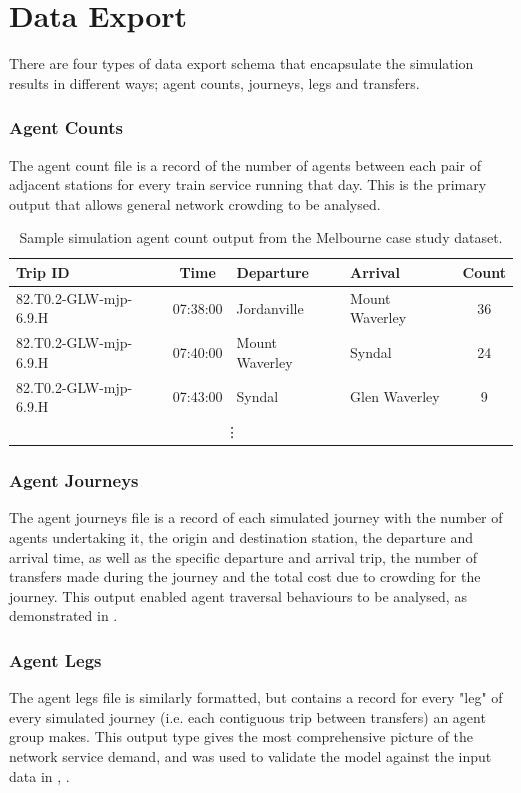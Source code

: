 \section{Data Export}
There are four types of data export schema that encapsulate the simulation results in different ways; agent counts, journeys, legs and transfers. 

\subsubsection{Agent Counts}
The agent count file is a record of the number of agents between each pair of adjacent stations for every train service running that day. This is the primary output that allows general network crowding to be analysed. 

\begin{table}[ht]
    \centering
    \caption[Sample simulation agent counts]{Sample simulation agent count output from the Melbourne case study dataset.}
    \begin{tabular}{lcllc}
         Trip ID & Time & Departure & Arrival & Count\\\hline
         82.T0.2-GLW-mjp-6.9.H & 07:38:00 & Jordanville & Mount Waverley& 36\\
         82.T0.2-GLW-mjp-6.9.H & 07:40:00 & Mount Waverley & Syndal& 24\\
         82.T0.2-GLW-mjp-6.9.H & 07:43:00 & Syndal & Glen Waverley & 9\\
        \multicolumn{4}{c}{\vdots}\\
    \end{tabular}
    \label{tab:AgentCountsFileStructure}
\end{table}
\subsubsection{Agent Journeys}  
The agent journeys file is a record of each simulated journey with the number of agents undertaking it, the origin and destination station, the departure and arrival time, as well as the specific departure and arrival trip, the number of transfers made during the journey and the total cost due to crowding for the journey. This output enabled agent traversal behaviours to be analysed, as demonstrated in . 

\subsubsection{Agent Legs}
The agent legs file is similarly formatted, but contains a record for every "leg" of every simulated journey (i.e. each contiguous trip between transfers) an agent group makes. This output type gives the most comprehensive picture of the network service demand, and was used to validate the model against the input data in , .


